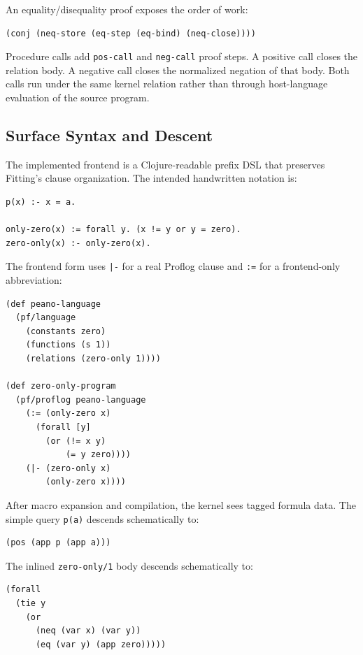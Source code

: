 \documentclass[acmsmall,screen,review,anonymous]{acmart}
\begin{document}
An equality/disequality proof exposes the order of work:

\begin{verbatim}
(conj (neq-store (eq-step (eq-bind) (neq-close))))
\end{verbatim}

Procedure calls add \texttt{pos-call} and \texttt{neg-call} proof steps.  A
positive call closes the relation body.  A negative call closes the normalized
negation of that body.  Both calls run under the same kernel relation rather
than through host-language evaluation of the source program.

\subsection{Surface Syntax and Descent}

The implemented frontend is a Clojure-readable prefix DSL that preserves
Fitting's clause organization.  The intended handwritten notation is:

\begin{verbatim}
p(x) :- x = a.

only-zero(x) := forall y. (x != y or y = zero).
zero-only(x) :- only-zero(x).
\end{verbatim}

The frontend form uses \texttt{|-} for a real Proflog clause and \texttt{:=}
for a frontend-only abbreviation:

\begin{verbatim}
(def peano-language
  (pf/language
    (constants zero)
    (functions (s 1))
    (relations (zero-only 1))))

(def zero-only-program
  (pf/proflog peano-language
    (:= (only-zero x)
      (forall [y]
        (or (!= x y)
            (= y zero))))
    (|- (zero-only x)
        (only-zero x))))
\end{verbatim}

After macro expansion and compilation, the kernel sees tagged formula data.  The
simple query \texttt{p(a)} descends schematically to:

\begin{verbatim}
(pos (app p (app a)))
\end{verbatim}

The inlined \texttt{zero-only/1} body descends schematically to:

\begin{verbatim}
(forall
  (tie y
    (or
      (neq (var x) (var y))
      (eq (var y) (app zero)))))
\end{verbatim}
\end{document}
